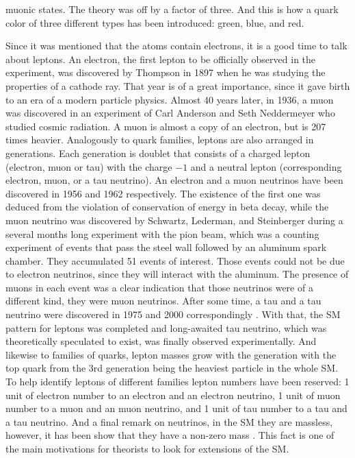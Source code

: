 muonic states. The theory was off by a factor of three. And this is how a quark color of three different types has been introduced: green, blue, and red. 



Since it was mentioned that the atoms contain electrons, it is a good time to talk about leptons. An electron, the first lepton to be officially observed in the experiment, was discovered by Thompson \cite{Davis:1989898} in 1897 when he was studying the properties of a cathode ray. That year is of a great importance, since it gave birth to an era of a modern particle physics. Almost 40 years later, in 1936, a muon was discovered \cite{Piccioni1996} in an experiment of Carl Anderson and Seth Neddermeyer who studied cosmic radiation. A muon is almost a copy of an electron, but is 207 times heavier. Analogously to quark families, leptons are also arranged in generations. Each generation is doublet that consists of a charged lepton (electron, muon or tau) with the charge $-1$ and a neutral lepton (corresponding electron, muon, or a tau neutrino). An electron and a muon neutrinos have been discovered in 1956 and 1962 respectively. The existence of the first one was deduced from the violation of conservation of energy in beta decay, while the muon neutrino \cite{PhysRevLett.9.36} was discovered by Schwartz, Lederman, and Steinberger during a several months long experiment with the pion beam, which was a counting experiment of events that pass the steel wall followed by an aluminum spark chamber. They accumulated 51 events of interest. Those events could not be due to electron neutrinos, since they will interact with the aluminum. The presence of muons in each event was a clear indication that those neutrinos were of a different kind, they were muon neutrinos. After some time, a tau and a tau neutrino were discovered in 1975 and 2000 correspondingly \cite{PhysRevLett.35.1489, Kodama:2000mp}. With that, the SM pattern for leptons was completed and long-awaited tau neutrino, which was theoretically speculated to exist, was finally observed experimentally. And likewise to families of quarks, lepton masses grow with the generation with the top quark from the 3rd generation being the heaviest particle in the whole SM. To help identify leptons of different families lepton numbers have been reserved: 1 unit of electron number to an electron and an electron neutrino, 1 unit of muon number to a muon and an muon neutrino, and 1 unit of tau number to a tau and a tau neutrino. And a final remark on neutrinos, in the SM they are massless, however, it has been show that they have a non-zero mass \cite{Bilenky:2014ema}. This fact is one of the main motivations for theorists to look for extensions of the SM. 

